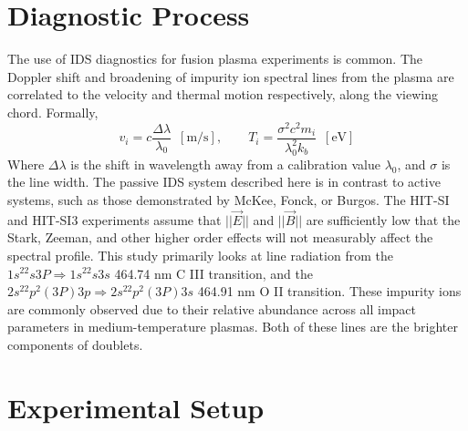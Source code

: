 
\section{Diagnostic Process}
\hspace{4ex}The use of IDS diagnostics for fusion plasma experiments is common\cite{den1994fast}. The Doppler shift and broadening of impurity ion spectral lines from the plasma are correlated to the velocity and thermal motion respectively, along the viewing chord. Formally, \\
\begin{equation}\label{Doppler_Eqns}
v_i = c\frac{\Delta\lambda}{\lambda_0}\,\,\,\mathrm{[m/s]},\qquad
T_i = \frac{\sigma^2c^2m_i}{\lambda_0^2k_b}\,\,\,\mathrm{[eV]}
\end{equation} 
Where $\Delta\lambda$ is the shift in wavelength away from a calibration value $\lambda_0$, and $\sigma$ is the line width. The passive IDS system described here is in contrast to active systems, such as those demonstrated by McKee\cite{mckee1999beam}, Fonck\cite{fonck1984determination}, or Burgos\cite{burgos2012hybrid}. The HIT-SI and HIT-SI3 experiments assume that $||\vec{E}||$ and $||\vec{B}||$ are sufficiently low that the Stark, Zeeman, and other higher order effects will not measurably affect the spectral profile. This study primarily looks at line radiation from the $1s^22s3P\Rightarrow1s^22s3s$ 464.74 nm C III transition, and the $2s^22p^2(3P)3p\Rightarrow2s^22p^2(3P)3s$ 464.91 nm O II transition. These impurity ions are commonly observed due to their relative abundance across all impact parameters in medium-temperature plasmas\cite{cothran2006fast}. Both of these lines are the brighter components of doublets. 

\section{Experimental Setup}
